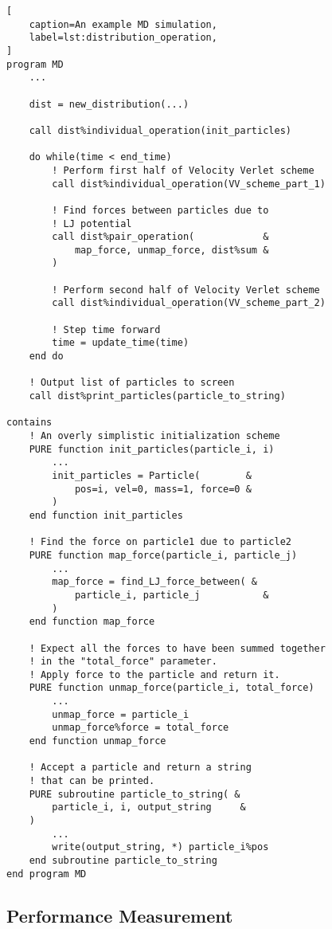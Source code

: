 \begin{lstlisting}[
    caption=An example MD simulation,
    label=lst:distribution_operation,
]
program MD
    ...

    dist = new_distribution(...)

    call dist%individual_operation(init_particles)

    do while(time < end_time)
        ! Perform first half of Velocity Verlet scheme
        call dist%individual_operation(VV_scheme_part_1)

        ! Find forces between particles due to
        ! LJ potential
        call dist%pair_operation(            &
            map_force, unmap_force, dist%sum &
        )

        ! Perform second half of Velocity Verlet scheme
        call dist%individual_operation(VV_scheme_part_2)

        ! Step time forward
        time = update_time(time)
    end do

    ! Output list of particles to screen
    call dist%print_particles(particle_to_string)

contains
    ! An overly simplistic initialization scheme
    PURE function init_particles(particle_i, i)
        ...
        init_particles = Particle(        &
            pos=i, vel=0, mass=1, force=0 &
        )
    end function init_particles

    ! Find the force on particle1 due to particle2
    PURE function map_force(particle_i, particle_j)
        ...
        map_force = find_LJ_force_between( &
            particle_i, particle_j           &
        )
    end function map_force

    ! Expect all the forces to have been summed together
    ! in the "total_force" parameter.
    ! Apply force to the particle and return it.
    PURE function unmap_force(particle_i, total_force)
        ...
        unmap_force = particle_i
        unmap_force%force = total_force
    end function unmap_force

    ! Accept a particle and return a string
    ! that can be printed.
    PURE subroutine particle_to_string( &
        particle_i, i, output_string     &
    )
        ...
        write(output_string, *) particle_i%pos
    end subroutine particle_to_string
end program MD
\end{lstlisting}



\subsection{Performance Measurement}

